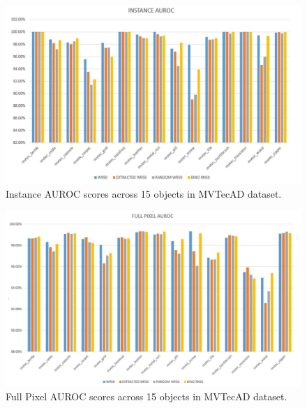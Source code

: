 \begin{figure}[h]
	\begin{center}
		\includegraphics[width=1.0\linewidth]{Chapter_4/wd_instance.png}
	\end{center}
	\caption{Instance AUROC scores across 15 objects in MVTecAD dataset.}
	\label{fig:wd_instance}
\end{figure}

\begin{figure}[h]
	\begin{center}
		\includegraphics[width=1.0\linewidth]{Chapter_4/wd_full_pixel.png}
	\end{center}
	\caption{Full Pixel AUROC scores across 15 objects in MVTecAD dataset.}
	\label{fig:wd_full_pixel}
\end{figure}

